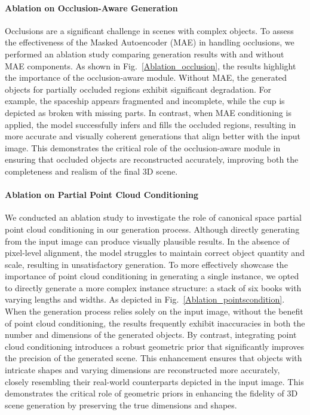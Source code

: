 \paragraph{Ablation on Occlusion-Aware Generation}
Occlusions are a significant challenge in scenes with complex objects. To assess the effectiveness of the Masked Autoencoder (MAE) in handling occlusions, we performed an ablation study comparing generation results with and without MAE components. As shown in Fig.~\ref{Ablation_occlusion}, the results highlight the importance of the occlusion-aware module. Without MAE, the generated objects for partially occluded regions exhibit significant degradation. For example, the spaceship appears fragmented and incomplete, while the cup is depicted as broken with missing parts. In contrast, when MAE conditioning is applied, the model successfully infers and fills the occluded regions, resulting in more accurate and visually coherent generations that align better with the input image. This demonstrates the critical role of the occlusion-aware module in ensuring that occluded objects are reconstructed accurately, improving both the completeness and realism of the final 3D scene.





\paragraph{Ablation on Partial Point Cloud Conditioning}
We conducted an ablation study to investigate the role of canonical space partial point cloud conditioning in our generation process. Although directly generating from the input image can produce visually plausible results. In the absence of pixel-level alignment, the model struggles to maintain correct object quantity and scale, resulting in unsatisfactory generation. To more effectively showcase the importance of point cloud conditioning in generating a single instance, we opted to directly generate a more complex instance structure: a stack of six books with varying lengths and widths. As depicted in Fig.~\ref{Ablation_pointscondition}. When the generation process relies solely on the input image, without the benefit of point cloud conditioning, the results frequently exhibit inaccuracies in both the number and dimensions of the generated objects. By contrast, integrating point cloud conditioning introduces a robust geometric prior that significantly improves the precision of the generated scene. This enhancement ensures that objects with intricate shapes and varying dimensions are reconstructed more accurately, closely resembling their real-world counterparts depicted in the input image. This demonstrates the critical role of geometric priors in enhancing the fidelity of 3D scene generation by preserving the true dimensions and shapes.

